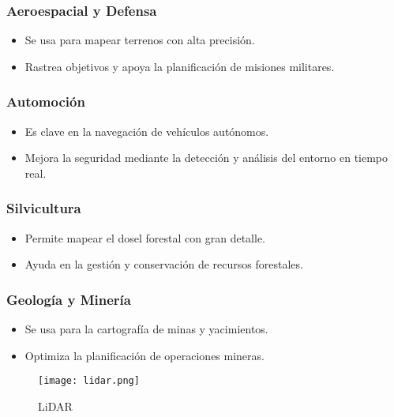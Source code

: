 \subsubsection{\textbf{Aeroespacial y Defensa}}
\begin{itemize}
	\item Se usa para mapear terrenos con alta precisión.
	\item Rastrea objetivos y apoya la planificación de misiones militares.
\end{itemize}

\subsubsection{\textbf{Automoción}}
\begin{itemize}
	\item Es clave en la navegación de vehículos autónomos.
	\item Mejora la seguridad mediante la detección y análisis del entorno en tiempo real.
\end{itemize}

\subsubsection{\textbf{Silvicultura}}
\begin{itemize}
	\item Permite mapear el dosel forestal con gran detalle.
	\item Ayuda en la gestión y conservación de recursos forestales.
\end{itemize}

\subsubsection{\textbf{Geología y Minería}}
\begin{itemize}
	\item Se usa para la cartografía de minas y yacimientos.
	\item Optimiza la planificación de operaciones mineras.
\end{itemize}
\begin{figure}[H]
	\centering
	\texttt{[image: lidar.png]}
	\caption{LiDAR}
\end{figure}
